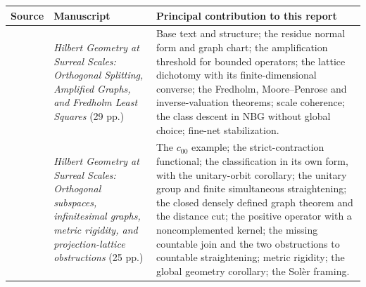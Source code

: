 \documentclass[11pt,letterpaper]{article}
\numberwithin{equation}{section}
\theoremstyle{definition}
\theoremstyle{remark}
\begin{document}
\begin{center}
\small
\renewcommand{\arraystretch}{1.15}
\begin{tabular}{>{\raggedright\arraybackslash}p{}>{\raggedright\arraybackslash}p{}>{\raggedright\arraybackslash}p{}}
\toprule
Source & Manuscript & Principal contribution to this report\\
\midrule
03 & \emph{Hilbert Geometry at Surreal Scales: Orthogonal Splitting,
Amplified Graphs, and Fredholm Least Squares} (29 pp.) &
Base text and structure; the residue normal form and graph chart; the
amplification threshold for bounded operators; the lattice dichotomy with
its finite-dimensional converse; the Fredholm, Moore--Penrose and
inverse-valuation theorems; scale coherence; the class descent in NBG
without global choice; fine-net stabilization.\\
06 & \emph{Hilbert Geometry at Surreal Scales: Orthogonal subspaces,
infinitesimal graphs, metric rigidity, and projection-lattice obstructions}
(25 pp.) &
The $c_{00}$ example; the strict-contraction functional; the classification
in its own form, with the unitary-orbit corollary; the unitary group and
finite simultaneous straightening; the closed densely defined graph theorem
and the distance cut; the positive operator with a noncomplemented kernel;
the missing countable join and the two obstructions to countable
straightening; metric rigidity; the global geometry corollary; the Sol\`er
framing.\\
\bottomrule
\end{tabular}
\end{center}
\end{document}
